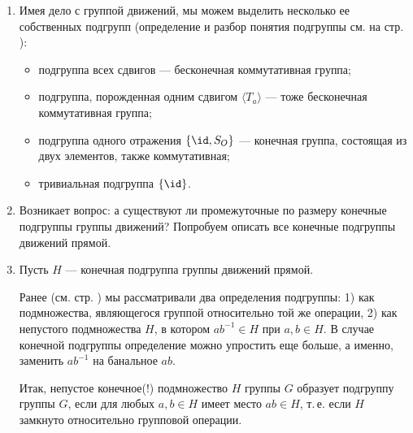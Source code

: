 \begin{enumerate}
\item Имея дело с группой движений, мы можем выделить несколько ее собственных подгрупп (определение и разбор понятия подгруппы см. на стр. \pageref{Subgroup}):
\begin{itemize}
\item подгруппа всех сдвигов --- бесконечная коммутативная группа;
\item подгруппа, порожденная одним сдвигом $\langle T_a\rangle$ --- тоже бесконечная коммутативная группа;
\item подгруппа одного отражения $\{\id, S_O\}$ --- конечная группа, состоящая из двух элементов, также коммутативная;
\item тривиальная подгруппа $\{\id\}$.
\end{itemize}
\item Возникает вопрос: а существуют ли промежуточные по размеру конечные подгруппы группы движений? Попробуем описать все конечные подгруппы движений прямой.
\item Пусть $H$ --- конечная подгруппа группы движений прямой.

Ранее (см. стр.  \pageref{Subgroup}) мы рассматривали два определения подгруппы: 1) как подмножества, являющегося группой относительно той же операции, 2) как непустого подмножества $H$, в котором $ab^{-1}\in H$ при $a,b\in H$. В случае конечной подгруппы определение можно упростить еще больше, а именно, заменить $ab^{-1}$ на банальное $ab$.

Итак, непустое конечное(!) подмножество $H$ группы $G$ образует подгруппу группы $G$, если для любых $a,b\in H$ имеет место $ab\in H$, т.\,е. если $H$ замкнуто относительно групповой операции.


\end{enumerate}
